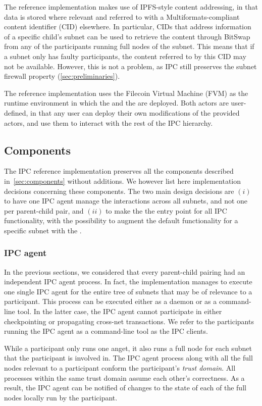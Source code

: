  The reference implementation makes use of IPFS-style content addressing, in that data is stored where relevant and referred to with a Multiformats-compliant~\cite{multiformats} content identifier (CID) elsewhere. In particular, CIDs that address information of a specific child's subnet can be used to retrieve the content through BitSwap~\cite{bitswap} from any of the participants running full nodes of the subnet. This means that if a subnet only has faulty participants, the content referred to by this CID may not be available. However, this is not a problem, as IPC still preserves the subnet firewall property (\cref{sec:preliminaries}).

The reference implementation uses the Filecoin Virtual Machine (FVM) as the runtime environment in which the \gw and the \sa are deployed. Both actors are user-defined, in that any user can deploy their own modifications of the provided actors, and use them to interact with the rest of the IPC hierarchy.


\subsection{Components}
The IPC reference implementation preserves all the components described in~\cref{sec:components} without additions. We however list here implementation decisions concerning these components. The two main design decisions are $(i)$ to have one IPC agent manage the interactions across all subnets, and not one per parent-child pair, and $(ii)$ to make the \gw the entry point for all IPC functionality, with the possibility to augment the default functionality for a specific subnet with the \sa.

 \subsubsection{IPC agent} 
 \label{sec:refimplipcagent}
 In the previous sections, we considered that every parent-child pairing had an independent IPC agent process. In fact, the implementation manages to execute one single IPC agent for the entire tree of subnets that may be of relevance to a participant. This process can be executed either as a daemon or as a command-line tool. In the latter case, the IPC agent cannot participate in either checkpointing or propagating cross-net transactions. We refer to the participants running the IPC agent as a command-line tool as the IPC clients.

While a participant only runs one \ipc anget, it also runs a full node for each subnet that the participant is involved in. The IPC agent process along with all the full nodes relevant to a participant conform the participant's \emph{trust domain}. All processes within the same trust domain assume each other's correctness.
As a result, the IPC agent can be notified of changes to the state of each of the full nodes locally run by the participant.
